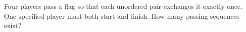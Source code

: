 Four players pass a flag so that each unordered pair exchanges it exactly once. One specified player must both start and finish. How many passing sequences exist?
